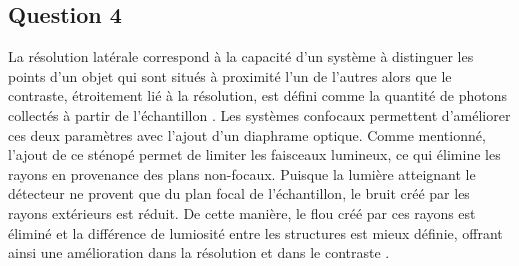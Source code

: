 \documentclass[11pt,letterpaper]{article}
\begin{document}
\subsection{Question 4}
La résolution latérale correspond à la capacité d'un système à distinguer les points d'un objet qui sont situés à proximité l'un de l'autres alors que le contraste, étroitement lié à la résolution, est défini comme la quantité de photons collectés à partir de l'échantillon \cite{spring_confocal_nodate}. Les systèmes confocaux permettent d'améliorer ces deux paramètres avec l'ajout d'un diaphrame optique. Comme mentionné, l'ajout de ce sténopé permet de limiter les faisceaux lumineux, ce qui élimine les rayons en provenance des plans non-focaux. Puisque la lumière atteignant le détecteur ne provent que du plan focal de l'échantillon, le bruit créé par les rayons extérieurs est réduit. De cette manière, le flou créé par ces rayons est éliminé et la différence de lumiosité entre les structures est mieux définie, offrant ainsi une amélioration dans la résolution et dans le contraste \cite{borlinghaus_pinhole_2017}.
\end{document}
